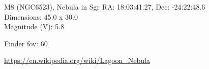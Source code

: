 \begin{block}{M8 (NGC6523), Nebula in Sgr}
    RA: 18:03:41.27, Dec: -24:22:48.6 \\ 
    Dimensions: 45.0 x 30.0 \\ 
    Magnitude (V): 5.8



    Finder fov: 60 

    \url{https://en.wikipedia.org/wiki/Lagoon_Nebula} 
\end{block}
